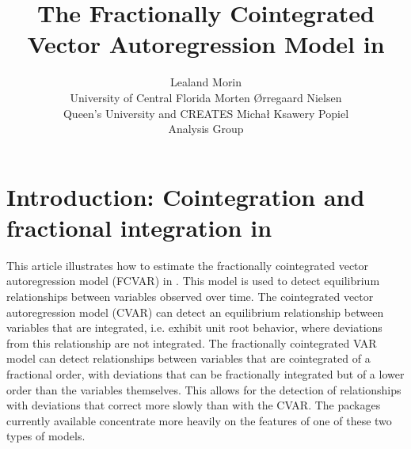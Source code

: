 \documentclass[article]{jss}
\author{Lealand Morin\\University of Central Florida
   \And Morten \O rregaard Nielsen\\Queen's University and CREATES
   \AND Micha\l{} Ksawery Popiel\\Analysis Group}
\title{The Fractionally Cointegrated Vector Autoregression Model in \proglang{R}}
\begin{document}


\section[Introduction: Cointegration and fractional integration in R]{Introduction: Cointegration and fractional integration in } \label{sec:intro}

% 

This article illustrates how to estimate 
  the fractionally cointegrated vector autoregression model (FCVAR) in . 
This model is used to detect equilibrium relationships between variables observed over time. 
The cointegrated vector autoregression model (CVAR) can detect an equilibrium relationship between variables that are integrated, i.e. exhibit unit root behavior, where deviations from this relationship are not integrated. 
The fractionally cointegrated VAR model can detect relationships between variables that are cointegrated of a fractional order, with deviations that can be fractionally integrated but of a lower order than the variables themselves. 
This allows for the detection of relationships with deviations that correct more slowly than with the CVAR. 
% 
The packages currently available concentrate more heavily on the features of one of these two types of models. 
% 
\end{document}
